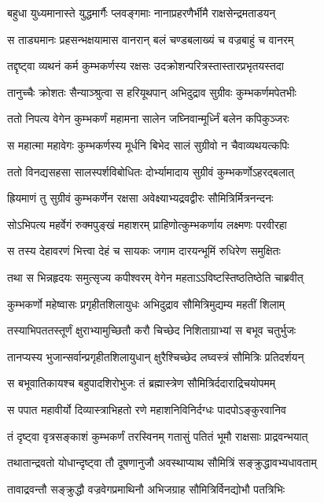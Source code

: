 \twolineshloka
{बहुधा युध्यमानास्ते युद्धमार्गैः प्लवङ्गमाः}
{नानाप्रहरणैर्भीमै राक्षसेन्द्रमताडयन्}


\twolineshloka
{स ताड्यमानः प्रहसन्भक्षयामास वानरान्}
{बलं चण्डबलाख्यं च वज्रबाहुं च वानरम्}


\twolineshloka
{तद्दृष्ट्वा व्यथनं कर्म कुम्भकर्णस्य रक्षसः}
{उदक्रोशन्परित्रस्तास्तारप्रभृतयस्तदा}


\twolineshloka
{तानुच्चैः क्रोशतः सैन्याञ्श्रुत्वा स हरियूथपान्}
{अभिदुद्राव सुग्रीवः कुम्भकर्णमपेतभीः}


\twolineshloka
{ततो निपत्य वेगेन कुम्भकर्णं महामना}
{सालेन जघ्निवान्मूर्ध्निं बलेन कपिकुञ्जरः}


\twolineshloka
{स महात्मा महावेगः कुम्भकर्णस्य मूर्धनि}
{बिभेद सालं सुग्रीवो न चैवाव्यथयत्कपिः}


\twolineshloka
{ततो विनद्यसहसा सालस्पर्शविबोधितः}
{दोर्भ्यामादाय सुग्रीवं कुम्भकर्णोऽहरद्बलात्}


\twolineshloka
{ह्रियमाणं तु सुग्रीवं कुम्भकर्णेन रक्षसा}
{अवेक्ष्याभ्यद्रवद्वीरः सौमित्रिर्मित्रनन्दनः}


\twolineshloka
{सोऽभिपत्य महर्वेगं रुक्मपुङ्खं महाशरम्}
{प्राहिणोत्कुम्भकर्णाय लक्ष्मणः परवीरहा}


\twolineshloka
{स तस्य देहावरणं भित्त्वा देहं च सायकः}
{जगाम दारयन्भूमिं रुधिरेण समुक्षितः}


\twolineshloka
{तथा स भिन्नहृदयः समुत्सृज्य कपीश्वरम्}
{वेगेन महताऽऽविष्टस्तिष्ठतिष्ठेति चाब्रवीत्}


\twolineshloka
{कुम्भकर्णो महेष्वासः प्रगृहीतशिलायुधः}
{अभिदुद्राव सौमित्रिमुद्यम्य महतीं शिलाम्}


\twolineshloka
{तस्याभिपततस्तूर्णं क्षुराभ्यामुच्छितौ करौ}
{चिच्छेद निशिताग्राभ्यां स बभूव चतुर्भुजः}


\twolineshloka
{तानप्यस्य भुजान्सर्वान्प्रगृहीतशिलायुधान्}
{क्षुरैश्चिच्छेद लघ्वस्त्रं सौमित्रिः प्रतिदर्शयन्}


\twolineshloka
{स बभूवातिकायश्च बहुपादशिरोभुजः}
{तं ब्रह्मास्त्रेण सौमित्रिर्ददाराद्रिचयोपमम्}


\twolineshloka
{स पपात महावीर्यो दिव्यास्त्राभिहतो रणे}
{महाशनिविनिर्दग्धः पादपोऽङ्कुरवानिव}


\twolineshloka
{तं दृष्ट्वा वृत्रसङ्काशं कुम्भकर्णं तरस्विनम्}
{गतासुं पतितं भूमौ राक्षसाः प्राद्रवन्भयात्}


\twolineshloka
{तथातान्द्रवतो योधान्दृष्ट्वा तौ दूषणानुजौ}
{अवस्थाप्याथ सौमित्रिं सङ्क्रुद्धावभ्यधावताम्}


\twolineshloka
{तावाद्रवन्तौ सङ्क्रुद्धौ वज्रवेगप्रमाथिनौ}
{अभिजग्राह सौमित्रिर्विनद्योभौ पतत्रिभिः}


